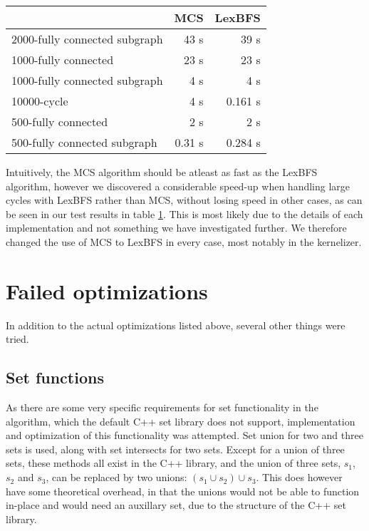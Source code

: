 \documentclass{article}
\begin{document}
		\begin{table}[!ht]
			\begin{tabular}{| l | r | r |}
			\hline
											& MCS 		& LexBFS 	\\ \hline
			2000-fully connected subgraph	& 43 s  	& 39 s 		\\ \hline
			1000-fully connected 			& 23 s 		& 23 s 		\\ \hline
			1000-fully connected subgraph	& 4 s   	& 4 s 		\\ \hline
			10000-cycle 					& 4 s   	& 0.161 s 	\\ \hline 
			500-fully connected 			& 2 s   	& 2 s 		\\ \hline 
			500-fully connected subgraph 	& 0.31 s 	& 0.284 s 	\\ \hline 
			\end{tabular}
			\label{table:maximum-cardinality-search}
		\end{table}
		Intuitively, the MCS algorithm should be atleast as fast as the LexBFS algorithm, however we discovered a considerable speed-up when handling large cycles with LexBFS rather than MCS, without losing speed in other cases, as can be seen in our test results in table \ref{table:maximum-cardinality-search}.
		This is most likely due to the details of each implementation and not something we have investigated further.
		We therefore changed the use of MCS to LexBFS in every case, most notably in the kernelizer.

	\section{Failed optimizations}
	In addition to the actual optimizations listed above, several other things were tried.

		\subsection{Set functions}
		As there are some very specific requirements for set functionality in the algorithm, which the default C++ set library does not support, implementation and optimization of this functionality was attempted.
		Set union for two and three sets is used, along with set intersects for two sets.
		Except for a union of three sets, these methods all exist in the C++ library, and the union of three sets, $s_1$, $s_2$ and $s_3$, can be replaced by two unions: $(s_1 \cup s_2) \cup s_3$.
		This does however have some theoretical overhead, in that the unions would not be able to function in-place and would need an auxillary set, due to the structure of the C++ set library.
\end{document}
